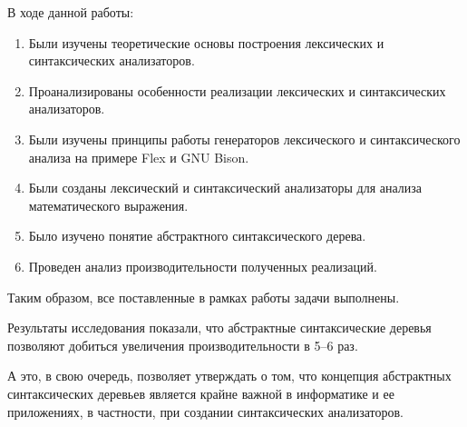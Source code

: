 В ходе данной работы:
\begin{enumerate}
    \item Были изучены теоретические основы построения лексических и синтаксических анализаторов.
    \item Проанализированы особенности реализации лексических и синтаксических анализаторов.
    \item Были изучены принципы работы генераторов лексического и синтаксического анализа на примере Flex и GNU Bison.
    \item Были созданы лексический и синтаксический анализаторы для анализа математического выражения.
    \item Было изучено понятие абстрактного синтаксического дерева.
    \item Проведен анализ производительности полученных реализаций.
\end{enumerate}
Таким образом, все поставленные в рамках работы задачи выполнены.

Результаты исследования показали, что абстрактные синтаксические деревья позволяют добиться увеличения производительности в 5–6 раз.

А это, в свою очередь, позволяет утверждать о том, что концепция абстрактных синтаксических деревьев является крайне важной в информатике и
ее приложениях, в частности, при создании синтаксических анализаторов.